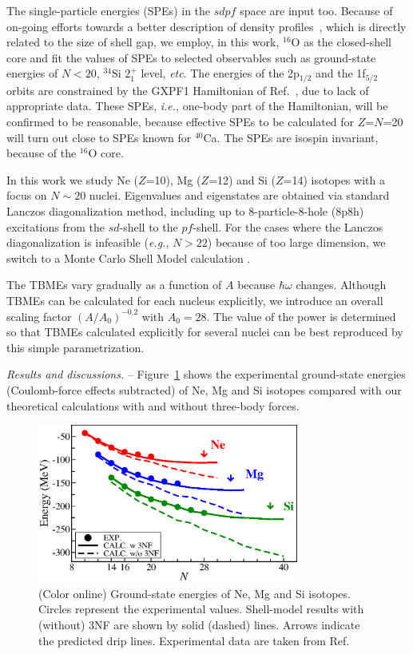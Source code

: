 \documentclass[aps,prl,twocolumn,groupedaddress,showkeys,showpacs,floatfix,superscriptaddress]{revtex4-1}
\newcommand\+{^\dagger}
\newcommand\hw{\hbar\omega}
\begin{document}
The single-particle energies (SPEs) in the $sdpf$ space are input too.  
Because of on-going efforts towards a better description of density
profiles~\cite{Ekstrom:2015gw},
which is directly related to the size of shell gap,
we employ, in this work, $^{16}$O as the closed-shell core and fit the values of SPEs to selected 
observables such as ground-state energies of $N<20$, $^{34}$Si 2$_1^+$ level, {\it etc}.  
The energies of the 2p$_{1/2}$ and the 1f$_{5/2}$ orbits are constrained
by the GXPF1 Hamiltonian of Ref.~\cite{PhysRevC.65.061301}, due to lack of 
appropriate data.
These SPEs, {\it i.e.}, one-body part of the Hamiltonian, will be confirmed to be reasonable, 
because effective SPEs to be calculated for $Z$=$N$=20 will turn out close to SPEs known for $^{40}$Ca.  
The SPEs are isospin invariant, because of the $^{16}$O core.

In this work we study Ne ($Z$=10), Mg ($Z$=12) and Si ($Z$=14) isotopes
with a focus on $N\sim20$ nuclei.
Eigenvalues and eigenstates are obtained via standard Lanczos diagonalization method, 
including up to 8-particle-8-hole (8p8h) %
excitations from the $sd$-shell to the $pf$-shell. 
For the cases where the Lanczos diagonalization is infeasible ({\it e.g.}, $N>22$) because of 
too large dimension, we switch to a Monte Carlo Shell Model calculation \cite{Otsuka:2001gx,Shimizu:2012dh}. 

The TBMEs vary gradually as a function of $A$ because $\hw$ changes.  
Although TBMEs can be calculated for each nucleus explicitly,  
we introduce an overall scaling factor $(A/A_0)^{-0.2}$ with  
$A_0=28$.  The value of the power is determined so that TBMEs calculated
explicitly for several nuclei can be best reproduced by this simple parametrization. 

{\it Results and discussions.} --
Figure~\ref{fig:GE} shows the experimental ground-state energies
(Coulomb-force effects subtracted) of Ne, Mg and Si isotopes compared
with our theoretical calculations with and without three-body forces.

\begin{figure}[tbh]
 \includegraphics[width=8.5725cm,angle=0,clip]{Fig1.eps}
 \caption{(Color online)
 Ground-state energies of Ne, Mg and Si isotopes. Circles represent the experimental
 values.   Shell-model results with (without) 3NF are shown by 
 solid (dashed) lines.
 Arrows indicate the predicted drip lines.
 Experimental data are taken from
 Ref.~\cite{NationalNuclearDataCenter:2008tv}}
 \label{fig:GE}
\end{figure}
\end{document}
